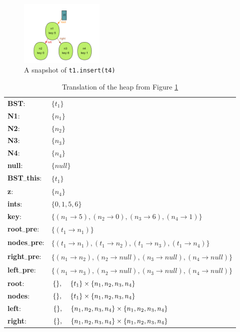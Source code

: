 \documentclass[11pt,twoside,a4paper]{book}
\begin{document}
\begin{figure}[ht]
\begin{center}
\includegraphics[width=4cm]{figures/bst}
\caption{A snapshot of \texttt{t1.insert(t4)}}
\label{fig:bstInsert}
\end{center}
\end{figure}

\newpage


\begin{table}[ht]
\begin{center}
\begin{tabular}{ l l }
	\textbf{BST}: & $\{t_1\}$\\
	\textbf{N1}: & $\{n_1\}$\\
	\textbf{N2}: & $\{n_2\}$\\
	\textbf{N3}: & $\{n_3\}$\\
	\textbf{N4}: & $\{n_4\}$\\
	\textbf{null}: & $\{null\}$\\
	\textbf{BST\textsubscript{--}this}: & $\{t_1\}$\\
	\textbf{z}: & $\{n_4\}$\\
	\textbf{ints}: & $\{0, 1, 5, 6\}$\\
  \hline
  	\textbf{key}: & $\{(n_1\rightarrow 5),(n_2\rightarrow
	0),(n_3\rightarrow 6),(n_4\rightarrow 1)\}$\\
	\textbf{root\textsubscript{--}pre}: & $\{(t_1\rightarrow n_1)\}$\\
	\textbf{nodes\textsubscript{--}pre}: & $\{(t_1\rightarrow n_1),(t_1\rightarrow
	n_2),(t_1\rightarrow n_3),(t_1\rightarrow n_4)\}$\\
	\textbf{right\textsubscript{--}pre}: & $\{(n_1\rightarrow n_2),(n_2\rightarrow
	null),(n_3\rightarrow null),(n_4\rightarrow null)\}$\\
	\textbf{left\textsubscript{--}pre}: & $\{(n_1\rightarrow n_3),(n_2\rightarrow
	null),(n_3\rightarrow null),(n_4\rightarrow null)\}$\\
	\hline
	\textbf{root}: & $\{\},\hspace{4mm}\{t_1\}\times\{n_1,n_2,n_3,n_4\}$\\
	\textbf{nodes}: & $\{\},\hspace{4mm}\{t_1\}\times\{n_1,n_2,n_3,n_4\}$\\
	\textbf{left}: &
	$\{\},\hspace{4mm}\{n_1,n_2,n_3,n_4\}\times\{n_1,n_2,n_3,n_4\}$\\
	\textbf{right}: &
	$\{\},\hspace{4mm}\{n_1,n_2,n_3,n_4\}\times\{n_1,n_2,n_3,n_4\}$\\
	
\end{tabular}
\end{center}
\caption{Translation of the heap from Figure \ref{fig:bstInsert}}
\label{fig:translationTable}
\end{table}
\end{document}
